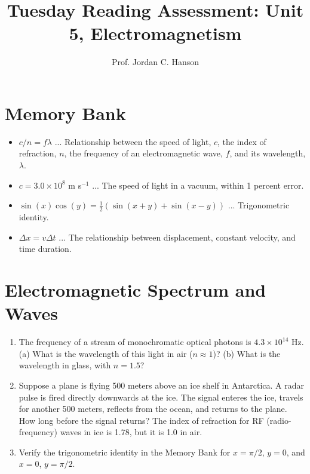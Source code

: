 \documentclass{article}
\begin{document}
\title{Tuesday Reading Assessment: Unit 5, Electromagnetism}
\author{Prof. Jordan C. Hanson}

\maketitle

\section{Memory Bank}

\begin{itemize}
\item $c/n = f \lambda$ ... Relationship between the speed of light, $c$, the index of refraction, $n$, the frequency of an electromagnetic wave, $f$, and its wavelength, $\lambda$.
\item $c = 3.0 \times 10^8$ m s$^{-1}$ ... The speed of light in a vacuum, within 1 percent error.
\item $\sin(x)\cos(y) = \frac{1}{2}\left(\sin(x+y) + \sin(x-y)\right)$ ... Trigonometric identity.
\item $\Delta x = v \Delta t$ ... The relationship between displacement, constant velocity, and time duration.
\end{itemize}

\section{Electromagnetic Spectrum and Waves}

\begin{enumerate}
\item The frequency of a stream of monochromatic optical photons is $4.3 \times 10^{14}$ Hz.  (a) What is the wavelength of this light in air ($n \approx 1$)?  (b) What is the wavelength in glass, with $n = 1.5$? \\ \vspace{2cm}
\item Suppose a plane is flying 500 meters above an ice shelf in Antarctica.  A radar pulse is fired directly downwards at the ice.  The signal enteres the ice, travels for another 500 meters, reflects from the ocean, and returns to the plane.  How long before the signal returns?  The index of refraction for RF (radio-frequency) waves in ice is 1.78, but it is 1.0 in air. \\ \vspace{2cm}
\item Verify the trigonometric identity in the Memory Bank for $x = \pi/2$, $y = 0$, and $x = 0$, $y = \pi/2$.
\end{enumerate}
\end{document}
